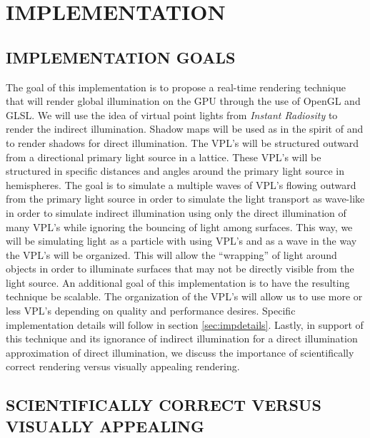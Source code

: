 \chapter{IMPLEMENTATION}

\section{IMPLEMENTATION GOALS} \label{sec:impgoals}

The goal of this implementation is to propose a real-time rendering technique that will render global illumination on the GPU through the use of OpenGL and GLSL.  We will use the idea of virtual point lights from \textit{Instant Radiosity} \cite{Keller1997} to render the indirect illumination.  Shadow maps will be used as in the spirit of \cite{Williams1978} and \cite{Reeves1987} to render shadows for direct illumination.  The VPL's will be structured outward from a directional primary light source in a lattice.  These VPL's will be structured in specific distances and angles around the primary light source in hemispheres. The goal is to simulate a multiple waves of VPL's flowing outward from the primary light source in order to simulate the light transport as wave-like in order to simulate indirect illumination using only the direct illumination of many VPL's while ignoring the bouncing of light among surfaces.  This way, we will be simulating light as a particle with using VPL's and as a wave in the way the VPL's will be organized.  This will allow the “wrapping” of light around objects in order to illuminate surfaces that may not be directly visible from the light source.  An additional goal of this implementation is to have the resulting technique be scalable.  The organization of the VPL's will allow us to use more or less VPL's depending on quality and performance desires.  Specific implementation details will follow in section \ref{sec:impdetails}.  Lastly, in support of this technique and its ignorance of indirect illumination for a direct illumination approximation of direct illumination, we discuss the importance of scientifically correct rendering versus visually appealing rendering.

\section{SCIENTIFICALLY CORRECT VERSUS VISUALLY APPEALING}

